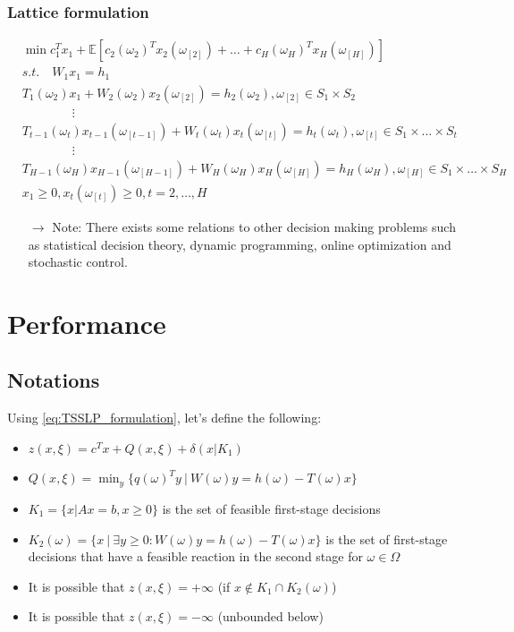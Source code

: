 \documentclass[12pt, openany]{report}
\newcommand{\E}{\mathbb{E}}
\theoremstyle{definition}
\begin{document}
\subsection{Lattice formulation}
\begin{equation}
	\begin{aligned}
		&\min c_1^Tx_1 + \E\left[c_2(\omega_{2})^T x_2(\omega_{[2]})+ \dots + c_H(\omega_{H})^Tx_H(\omega_{[H]})\right]\\
		&s.t. \quad W_1x_1 = h_1\\
		&T_1(\omega_{2})x_1 + W_2(\omega_{2})x_2(\omega_{[2]}) = h_2(\omega_{2}), \omega_{[2]} \in S_1 \times S_2\\
		&\qquad \qquad \vdots\\
		&T_{t-1}(\omega_{t})x_{t-1}(\omega_{[t-1]}) + W_t(\omega_{t})x_t(\omega_{[t]}) = h_t(\omega_{t}), \omega_{[t]} \in S_1 \times \dots \times S_t\\
		&\qquad \qquad \vdots\\ 
		&T_{H-1}(\omega_{H})x_{H-1}(\omega_{[H-1]}) + W_H(\omega_{H})x_H(\omega_{[H]}) = h_H(\omega_{H}), \omega_{[H]} \in S_1 \times \dots \times S_H\\
		&x_1 \geq 0, x_t(\omega_{[t]}) \geq 0, t=2, \dots, H
	\end{aligned}
\end{equation}
\begin{itemize}
	\item [$\rightarrow$] Note: There exists some relations to other decision making problems such as statistical decision theory, dynamic programming, online optimization and stochastic control.
\end{itemize}

\chapter{Performance}
\section{Notations}
Using \eqref{eq:TSSLP_formulation}, let's define the following:
\begin{itemize}
	\item $z(x,\xi) = c^Tx+Q(x,\xi)+\delta(x|K_1)$
	\item $Q(x,\xi) = \displaystyle \min_y\{q(\omega)^Ty\ |\ W(\omega)y=h(\omega)-T(\omega)x\}$
	\item $K_1 = \{x|Ax=b,x\geq0\}$ is the set of feasible first-stage decisions
	\item $K_2(\omega)=\{x\ |\ \exists y\geq0:W(\omega)y=h(\omega)-T(\omega)x\}$ is the set of first-stage decisions that have a feasible reaction in the second stage for $\omega \in \Omega$
	\item It is possible that $z(x,\xi) = + \infty$ (if $x \notin K_1 \cap K_2(\omega)$)
	\item It is possible that $z(x,\xi) = - \infty$ (unbounded below)
\end{itemize}
\end{document}
